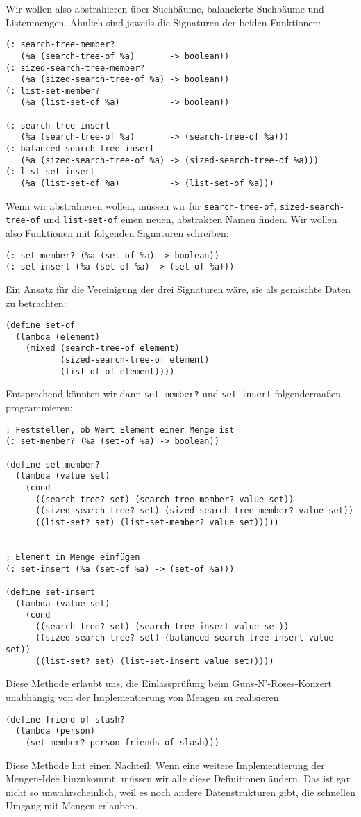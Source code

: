 Wir wollen also abstrahieren über Suchbäume, balancierte Suchbäume und
Listenmengen.  Ähnlich sind jeweils die Signaturen der beiden
Funktionen:
%
\begin{lstlisting}
(: search-tree-member?
   (%a (search-tree-of %a)       -> boolean))
(: sized-search-tree-member?
   (%a (sized-search-tree-of %a) -> boolean))
(: list-set-member?
   (%a (list-set-of %a)          -> boolean))

(: search-tree-insert
   (%a (search-tree-of %a)       -> (search-tree-of %a)))
(: balanced-search-tree-insert
   (%a (sized-search-tree-of %a) -> (sized-search-tree-of %a)))
(: list-set-insert
   (%a (list-set-of %a)          -> (list-set-of %a)))
\end{lstlisting}
%
Wenn wir abstrahieren wollen, müssen wir für
\lstinline{search-tree-of}, \lstinline{sized-search-tree-of} und
\lstinline{list-set-of} einen neuen, abstrakten Namen finden.  Wir
wollen also Funktionen mit folgenden Signaturen schreiben:
%
\begin{lstlisting}
(: set-member? (%a (set-of %a) -> boolean))
(: set-insert (%a (set-of %a) -> (set-of %a)))
\end{lstlisting}
%
Ein Ansatz für die Vereinigung der drei Signaturen wäre, sie als
gemischte Daten zu betrachten:
%
\begin{lstlisting}
(define set-of
  (lambda (element)
    (mixed (search-tree-of element)
           (sized-search-tree-of element)
           (list-of-of element))))
\end{lstlisting}
%
Entsprechend könnten wir dann \lstinline{set-member?} und
\lstinline{set-insert} folgendermaßen programmieren:
%
\begin{lstlisting}
; Feststellen, ob Wert Element einer Menge ist
(: set-member? (%a (set-of %a) -> boolean))

(define set-member?
  (lambda (value set)
    (cond
      ((search-tree? set) (search-tree-member? value set))
      ((sized-search-tree? set) (sized-search-tree-member? value set))
      ((list-set? set) (list-set-member? value set)))))
    

; Element in Menge einfügen
(: set-insert (%a (set-of %a) -> (set-of %a)))

(define set-insert
  (lambda (value set)
    (cond
      ((search-tree? set) (search-tree-insert value set))
      ((sized-search-tree? set) (balanced-search-tree-insert value set))
      ((list-set? set) (list-set-insert value set)))))
\end{lstlisting}
%
Diese Methode erlaubt uns, die Einlassprüfung beim
Guns-N'-Roses-Konzert unabhängig von der Implementierung von Mengen zu
realisieren:
%
\begin{lstlisting}
(define friend-of-slash?
  (lambda (person)
    (set-member? person friends-of-slash)))
\end{lstlisting}
%
Diese Methode hat einen Nachteil: Wenn eine weitere Implementierung
der Mengen-Idee hinzukommt, müssen wir alle diese Definitionen ändern.
Das ist gar nicht so unwahrscheinlich, weil es noch andere
Datenstrukturen gibt, die schnellen Umgang mit Mengen erlauben.

